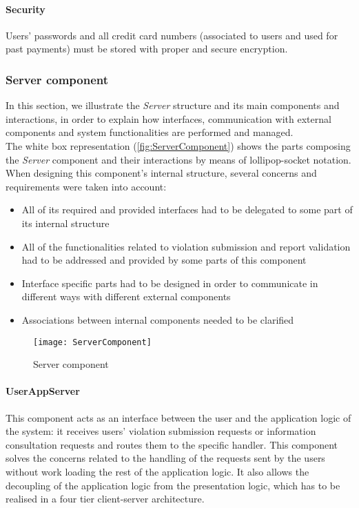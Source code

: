 \paragraph{Security}Users' passwords and all credit card numbers (associated to users and used for past payments) must be stored with proper and secure encryption.

\clearpage
\subsubsection{Server component}
In this section, we illustrate the \emph{Server} structure and its main components and interactions, in order to explain how interfaces, communication with external components and system functionalities are performed and managed.
\\

The white box representation (\autoref{fig:ServerComponent}) shows the parts composing the \emph{Server} component and their interactions by means of lollipop-socket notation. When designing this component's internal structure, several concerns and requirements were taken into account:
\begin{itemize}
	\item All of its required and provided interfaces had to be delegated to some part of its internal structure
	\item All of the functionalities related to violation submission and report validation had to be addressed and provided by some parts of this component
	\item Interface specific parts had to be designed in order to communicate in different ways with different external components
	\item Associations between internal components needed to be clarified
\end{itemize}

\begin{figure}[h]
	\centering
	\texttt{[image: ServerComponent]}
	\caption{
	\label{fig:ServerComponent} 
		Server component
	}
\end{figure}

\paragraph{UserAppServer}
This component acts as an interface between the user and the application logic of the system: it receives users' violation submission requests or information consultation requests and routes them to the specific handler. This component solves the concerns related to the handling of the requests sent by the users without work loading the rest of the application logic. It also allows the decoupling of the application logic from the presentation logic, which has to be realised in a four tier client-server architecture.

